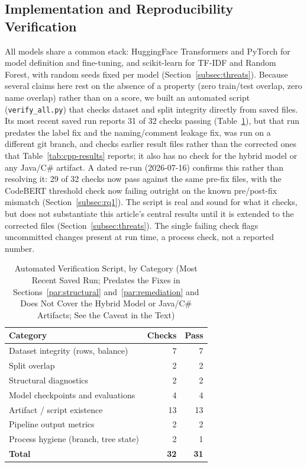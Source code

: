 \documentclass{ieeeaccess}
\begin{document}
\subsection{Implementation and Reproducibility Verification}
\label{subsec:verification}
All models share a common stack: HuggingFace Transformers and PyTorch for model definition and fine-tuning, and scikit-learn for TF-IDF and Random Forest, with random seeds fixed per model (Section~\ref{subsec:threats}). Because several claims here rest on the absence of a property (zero train/test overlap, zero name overlap) rather than on a score, we built an automated script (\texttt{verify\_all.py}) that checks dataset and split integrity directly from saved files. Its most recent saved run reports 31 of 32 checks passing (Table~\ref{tab:verify}), but that run predates the label fix and the naming/comment leakage fix, was run on a different git branch, and checks earlier result files rather than the corrected ones that Table~\ref{tab:cpp-results} reports; it also has no check for the hybrid model or any Java/C\# artifact. A dated re-run (2026-07-16) confirms this rather than resolving it: 29 of 32 checks now pass against the same pre-fix files, with the CodeBERT threshold check now failing outright on the known pre/post-fix mismatch (Section~\ref{subsec:rq1}). The script is real and sound for what it checks, but does not substantiate this article's central results until it is extended to the corrected files (Section~\ref{subsec:threats}). The single failing check flags uncommitted changes present at run time, a process check, not a reported number.

\begin{table}[t]
\centering
\caption{Automated Verification Script, by Category (Most Recent Saved Run; Predates the Fixes in Sections~\ref{par:structural} and~\ref{par:remediation} and Does Not Cover the Hybrid Model or Java/C\# Artifacts; See the Caveat in the Text)}
\label{tab:verify}
\begin{tabular}{@{}lrr@{}}
\toprule
\textbf{Category} & \textbf{Checks} & \textbf{Pass} \\
\midrule
Dataset integrity (rows, balance)      & 7  & 7  \\
Split overlap                          & 2  & 2  \\
Structural diagnostics                 & 2  & 2  \\
Model checkpoints and evaluations      & 4  & 4  \\
Artifact / script existence            & 13 & 13 \\
Pipeline output metrics                & 2  & 2  \\
Process hygiene (branch, tree state)   & 2  & 1  \\
\midrule
\textbf{Total}                         & \textbf{32} & \textbf{31} \\
\bottomrule
\end{tabular}
\end{table}
\end{document}
